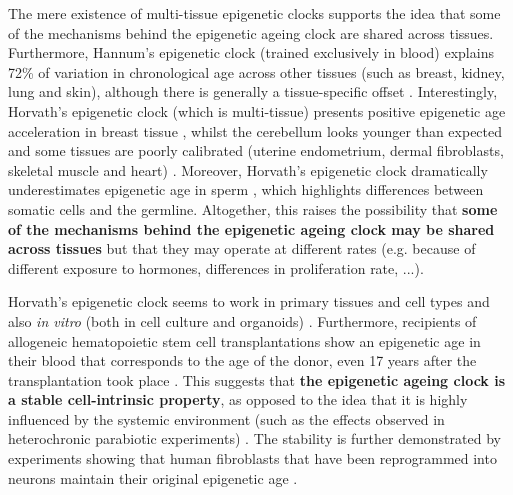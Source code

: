 \bigskip

The mere existence of multi-tissue epigenetic clocks supports the idea that some of the mechanisms behind the epigenetic ageing clock are shared across tissues. Furthermore, Hannum's epigenetic clock (trained exclusively in blood) explains 72\% of variation in chronological age across other tissues (such as breast, kidney, lung and skin), although there is generally a tissue-specific offset \cite{Hannum2013}. Interestingly, Horvath's epigenetic clock (which is multi-tissue) presents positive epigenetic age acceleration in breast tissue \cite{Sehl2017}, whilst the cerebellum looks younger than expected \cite{Horvath2015} and some tissues are poorly calibrated (uterine endometrium, dermal fibroblasts, skeletal muscle and heart) \cite{Horvath2013}. Moreover, Horvath's epigenetic clock dramatically underestimates epigenetic age in sperm \cite{Horvath2013}, which highlights differences between somatic cells and the germline. Altogether, this raises the possibility that \textbf{some of the mechanisms behind the epigenetic ageing clock may be shared across tissues} but that they may operate at different rates (e.g. because of different exposure to hormones, differences in proliferation rate, ...). 

\bigskip

Horvath's epigenetic clock seems to work in primary tissues and cell types and also \textit{in vitro} (both in cell culture and organoids) \cite{Horvath2013,Hoshino2019}. Furthermore, recipients of allogeneic hematopoietic stem cell transplantations show an epigenetic age in their blood that corresponds to the age of the donor, even 17 years after the transplantation took place \cite{Soraas2019}. This suggests that \textbf{the epigenetic ageing clock is a stable cell-intrinsic property}, as opposed to the idea that it is highly influenced by the systemic environment (such as the effects observed in heterochronic parabiotic experiments) \cite{Conboy2005}. The stability is further demonstrated by experiments showing that human fibroblasts that have been reprogrammed into neurons maintain their original epigenetic age \cite{Huh2016}.     

\bigskip


